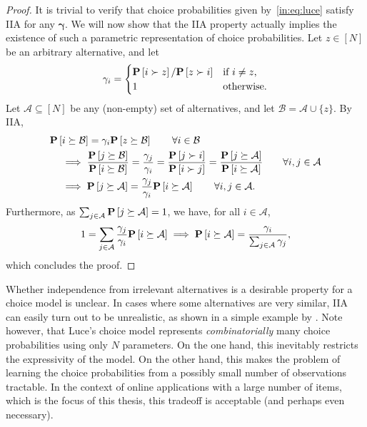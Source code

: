 \begin{proof}
It is trivial to verify that choice probabilities given by~\eqref{in:eq:luce} satisfy IIA for any $\bm{\gamma}$.
We will now show that the IIA property actually implies the existence of such a parametric representation of choice probabilities.
Let $z \in [N]$ be an arbitrary alternative, and let
\begin{align*}
\gamma_i =
\begin{cases}
\mathbf{P}\left[ i \succ z \right] / \mathbf{P}\left[ z \succ i \right] & \text{if $i \ne z$,} \\
1                                   & \text{otherwise.} \\
\end{cases}
\end{align*}
Let $\mathcal{A} \subseteq [N]$ be any (non-empty) set of alternatives, and let $\mathcal{B} = \mathcal{A} \cup \{ z \}$.
By IIA,
\begin{align*}
&\mathbf{P}\left[ i \succeq \mathcal{B} \right] = \gamma_i \mathbf{P}\left[ z \succeq \mathcal{B} \right]
    \qquad \forall i \in \mathcal{B} \\
&\quad \implies
    \frac{\mathbf{P}\left[ j \succeq \mathcal{B} \right]}{\mathbf{P}\left[ i \succeq \mathcal{B} \right]}
    = \frac{\gamma_j}{\gamma_i}
    = \frac{\mathbf{P}\left[ j \succ i \right]}{\mathbf{P}\left[ i \succ j \right]}
    = \frac{\mathbf{P}\left[ j \succeq \mathcal{A} \right]}{\mathbf{P}\left[ i \succeq \mathcal{A} \right]}
    \qquad \forall i, j \in \mathcal{A} \\
&\quad \implies \mathbf{P}\left[ j \succeq \mathcal{A} \right] = \frac{\gamma_j}{\gamma_i} \mathbf{P}\left[ i \succeq \mathcal{A} \right]
    \qquad \forall i, j \in \mathcal{A}.
\end{align*}
Furthermore, as $\sum_{j \in \mathcal{A}} \mathbf{P}\left[ j \succeq \mathcal{A} \right] = 1$, we have, for all $i \in \mathcal{A}$,
\begin{align*}
1 = \sum_{j \in \mathcal{A}} \frac{\gamma_j}{\gamma_i} \mathbf{P}\left[ i \succeq \mathcal{A} \right]
    \implies \mathbf{P}\left[ i \succeq \mathcal{A} \right] = \frac{\gamma_i}{\sum_{j \in \mathcal{A}} \gamma_j},
\end{align*}
which concludes the proof.
\end{proof}

Whether independence from irrelevant alternatives is a desirable property for a choice model is unclear.
In cases where some alternatives are very similar, IIA can easily turn out to be unrealistic, as shown in a simple example by \citet{debreu1960review}.
Note however, that Luce's choice model represents \emph{combinatorially} many choice probabilities using only $N$ parameters.
On the one hand, this inevitably restricts the expressivity of the model.
On the other hand, this makes the problem of learning the choice probabilities from a possibly small number of observations tractable.
In the context of online applications with a large number of items, which is the focus of this thesis, this tradeoff is acceptable (and perhaps even necessary).

